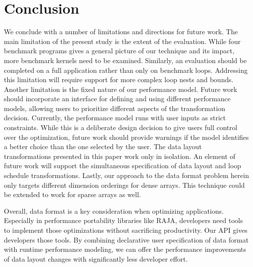 \documentclass[sigconf,review=true]{acmart}
\begin{document}
\section{Conclusion}


We conclude with a number of limitations and directions for future work.
The main limitation of the present study is the extent of the evaluation.
While four benchmark programs gives a general picture of our technique and its impact, more benchmark kernels need to be examined.
Similarly, an evaluation should be completed on a full application rather than only on benchmark loops.
Addressing this limitation will require support for more complex loop nests and bounds.
Another limitation is the fixed nature of our performance model.
Future work should incorporate an interface for defining and using different performance models, allowing users to prioritize different aspects of the transformation decision.
Currently, the performance model runs with user inputs as strict constraints.
While this is a deliberate design decision to give users full control over the optimization, future work should provide warnings if the model identifies a better choice than the one selected by the user. 
The data layout transformations presented in this paper work only in isolation. 
An element of future work will support the simultaneous specification of data layout and loop schedule transformations. 
Lastly, our approach to the data format problem herein only targets different dimension orderings for dense arrays. 
This technique could be extended to work for sparse arrays as well. 

Overall, data format is a key consideration when optimizing applications.
Especially in performance portability libraries like RAJA, developers need tools to implement those optimizations without sacrificing productivity.
Our API gives developers those tools.
By combining declarative user specification of data format with runtime performance modeling, we can offer the performance improvements of data layout changes with significantly less developer effort.
\balance



\end{document}
